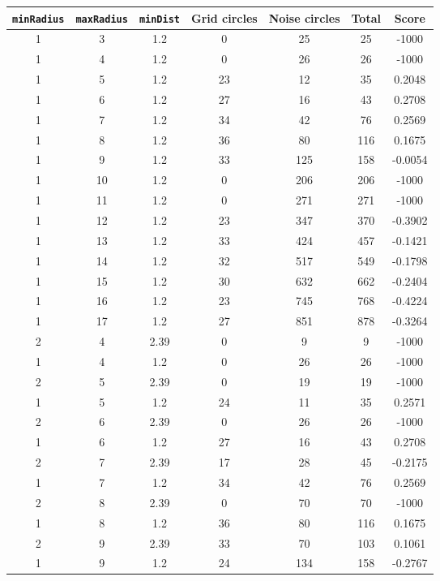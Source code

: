 \documentclass[letterpaper, 12pt]{article}
\begin{document}
\begin{longtable}{|c|c|c|c|c|c|c|}
\hline
\textbf{\texttt{minRadius}} & \textbf{\texttt{maxRadius}} & \textbf{\texttt{minDist}} & \textbf{Grid circles} & \textbf{Noise circles} & \textbf{Total} & \textbf{Score} \\
\hline
1 & 3 & 1.2 & 0 & 25 & 25 & -1000 \\
\hline
1 & 4 & 1.2 & 0 & 26 & 26 & -1000 \\
\hline
1 & 5 & 1.2 & 23 & 12 & 35 & 0.2048 \\
\hline
1 & 6 & 1.2 & 27 & 16 & 43 & 0.2708 \\
\hline
1 & 7 & 1.2 & 34 & 42 & 76 & 0.2569 \\
\hline
1 & 8 & 1.2 & 36 & 80 & 116 & 0.1675 \\
\hline
1 & 9 & 1.2 & 33 & 125 & 158 & -0.0054 \\
\hline
1 & 10 & 1.2 & 0 & 206 & 206 & -1000 \\
\hline
1 & 11 & 1.2 & 0 & 271 & 271 & -1000 \\
\hline
1 & 12 & 1.2 & 23 & 347 & 370 & -0.3902 \\
\hline
1 & 13 & 1.2 & 33 & 424 & 457 & -0.1421 \\
\hline
1 & 14 & 1.2 & 32 & 517 & 549 & -0.1798 \\
\hline
1 & 15 & 1.2 & 30 & 632 & 662 & -0.2404 \\
\hline
1 & 16 & 1.2 & 23 & 745 & 768 & -0.4224 \\
\hline
1 & 17 & 1.2 & 27 & 851 & 878 & -0.3264 \\
\hline
2 & 4 & 2.39 & 0 & 9 & 9 & -1000 \\
\hline
1 & 4 & 1.2 & 0 & 26 & 26 & -1000 \\
\hline
2 & 5 & 2.39 & 0 & 19 & 19 & -1000 \\
\hline
1 & 5 & 1.2 & 24 & 11 & 35 & 0.2571 \\
\hline
2 & 6 & 2.39 & 0 & 26 & 26 & -1000 \\
\hline
1 & 6 & 1.2 & 27 & 16 & 43 & 0.2708 \\
\hline
2 & 7 & 2.39 & 17 & 28 & 45 & -0.2175 \\
\hline
1 & 7 & 1.2 & 34 & 42 & 76 & 0.2569 \\
\hline
2 & 8 & 2.39 & 0 & 70 & 70 & -1000 \\
\hline
1 & 8 & 1.2 & 36 & 80 & 116 & 0.1675 \\
\hline
2 & 9 & 2.39 & 33 & 70 & 103 & 0.1061 \\
\hline
1 & 9 & 1.2 & 24 & 134 & 158 & -0.2767 \\

\end{longtable}
\end{document}

